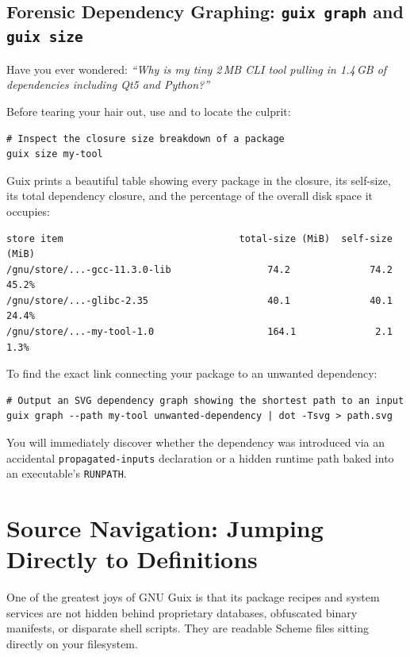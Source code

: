 \subsection{Forensic Dependency Graphing: \texttt{guix graph} and \texttt{guix size}}

Have you ever wondered: \emph{``Why is my tiny 2\,MB CLI tool pulling in 1.4\,GB of dependencies including Qt5 and Python?''}

Before tearing your hair out, use  and  to locate the culprit:

\begin{lstlisting}[style=guixcli]
# Inspect the closure size breakdown of a package
guix size my-tool
\end{lstlisting}

Guix prints a beautiful table showing every package in the closure, its self-size, its total dependency closure, and the percentage of the overall disk space it occupies:
\begin{lstlisting}[style=guixcli]
store item                               total-size (MiB)  self-size (MiB)
/gnu/store/...-gcc-11.3.0-lib                 74.2              74.2   45.2%
/gnu/store/...-glibc-2.35                     40.1              40.1   24.4%
/gnu/store/...-my-tool-1.0                    164.1              2.1    1.3%
\end{lstlisting}

To find the exact link connecting your package to an unwanted dependency:
\begin{lstlisting}[style=guixcli]
# Output an SVG dependency graph showing the shortest path to an input
guix graph --path my-tool unwanted-dependency | dot -Tsvg > path.svg
\end{lstlisting}
You will immediately discover whether the dependency was introduced via an accidental \texttt{propagated-inputs} declaration or a hidden runtime path baked into an executable's \texttt{RUNPATH}.

\section{Source Navigation: Jumping Directly to Definitions}

One of the greatest joys of GNU Guix is that its package recipes and system services are not hidden behind proprietary databases, obfuscated binary manifests, or disparate shell scripts. They are readable Scheme files sitting directly on your filesystem.

